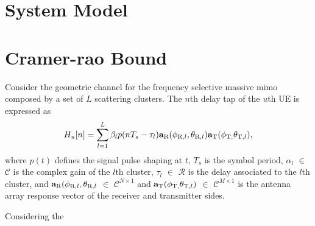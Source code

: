 \documentclass[12pt,a4paper,twoside,english]{article}
\begin{document}
	
\section{System Model}	



\section{Cramer-rao Bound }
\label{sec:CR_bound}

Consider the geometric channel for the frequency selective massive \gls{mimo}
composed by a set of $L$ scattering clusters. The $n$th delay tap of the $u$th
\gls{UE} is expressed as 
\begin{align}
  H_{u}[n] = \sum^{L}_{l=1} \beta _l p(nT_s - \tau _l) \mathbf{a} _{\textrm{R} }(\phi_{\textrm{R},l},\theta_{\textrm{R},l})\mathbf{a} _{\textrm{T}}(\phi_{\textrm{T},}\theta _{\textrm{T} , l}),
\end{align}
where  $p(t)$ defines the signal pulse shaping at $t$, $T_s$ is the symbol
period, $\alpha _l $ $\in$ $\mathcal{C}$ is the complex gain of the $l$th
cluster, $\tau _l$ $\in$ $\mathcal{R}$  is the delay associated to the $l$th
cluster, and  $\mathbf{a} _{\textrm{R} }(\phi_{\textrm{R},l},\theta_{\textrm{R},l}$
$\in$ $\mathcal{C}^{N \times 1}$ and $\mathbf{a}
_{\textrm{T}}(\phi_{\textrm{T},}\theta _{\textrm{T} , l})$ $\in$ $\mathcal{C}
^{M \times 1}$ is the antenna array response vector of the
receiver and transmitter sides.

Considering the 




 	
\end{document}
